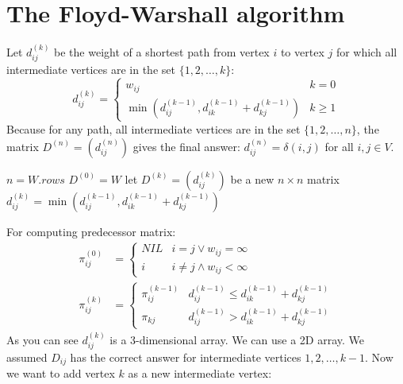 \documentclass{book}
\begin{document}
	\section{The Floyd-Warshall algorithm}
	Let $d_{ij}^{(k)}$ be the weight of a shortest path from vertex $i$ to vertex $j$ for which all intermediate vertices are in the set $\{1, 2, \dots, k\}$:
	\begin{equation*}
	d_{ij}^{(k)} = \begin{cases}
		w_{ij} & k = 0 \\
		\min(d_{ij}^{(k - 1)}, d_{ik}^{(k - 1)} + d_{kj}^{(k - 1)}) & k \ge 1
	\end{cases}
	\end{equation*}
	Because for any path, all intermediate vertices are in the set $\{1, 2, \dots, n\}$, the matrix $D^{(n)} = (d_{ij}^{(n)})$ gives the final answer: $d_{ij}^{(n)} = \delta(i, j)$ for all $i, j \in V$.
	
		\begin{algorithm*}[h!]
			\begin{algorithmic}[1]
					\State $n = W.rows$
					\State $D^{(0)} = W$
						\State let $D^{(k)} = (d_{ij}^{(k)})$ be a new $n \times n$ matrix
								\State $d_{ij}^{(k)} = \min(d_{ij}^{(k - 1)}, d_{ik}^{(k - 1)} + d_{kj}^{(k - 1)})$
							\EndFor
						\EndFor
					\EndFor
				\EndFunction
			\end{algorithmic}
		\end{algorithm*}
		\FloatBarrier
	For computing predecessor matrix:
	\begin{equation*}
	\begin{split}
		\pi_{ij}^{(0)} &=
		\begin{cases}
			NIL & i = j \lor w_{ij} = \infty \\
			i & i \ne j \land w_{ij} < \infty
		\end{cases}
		\\
		\pi_{ij}^{(k)} &= 
		\begin{cases}
			\pi_{ij}^{(k - 1)} & d_{ij}^{(k - 1)} \le d_{ik}^{(k - 1)} + d_{kj}^{(k - 1)} \\
			\pi_{kj} & d_{ij}^{(k - 1)} > d_{ik}^{(k - 1)} + d_{kj}^{(k - 1)}
		\end{cases}
	\end{split}
	\end{equation*}
	As you can see $d_{ij}^{(k)}$ is a 3-dimensional array. We can use a 2D array. We assumed $D_{ij}$ has the correct answer for intermediate vertices $1, 2, \dots, k - 1$. Now we want to add vertex $k$ as a new intermediate vertex:
\end{document}
